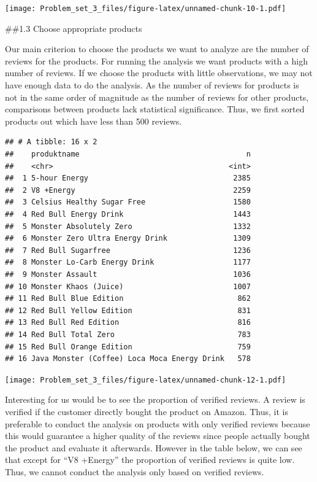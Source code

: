\documentclass[
]{article}
\begin{document}
\texttt{[image: Problem\_set\_3\_files/figure-latex/unnamed-chunk-10-1.pdf]}

\#\#1.3 Choose appropriate products

Our main criterion to choose the products we want to analyze are the
number of reviews for the products. For running the analysis we want
products with a high number of reviews. If we choose the products with
little observations, we may not have enough data to do the analysis. As
the number of reviews for products is not in the same order of magnitude
as the number of reviews for other products, comparisons between
products lack statistical significance. Thus, we first sorted products
out which have less than 500 reviews.

\begin{verbatim}
## # A tibble: 16 x 2
##    produktname                                      n
##    <chr>                                        <int>
##  1 5-hour Energy                                 2385
##  2 V8 +Energy                                    2259
##  3 Celsius Healthy Sugar Free                    1580
##  4 Red Bull Energy Drink                         1443
##  5 Monster Absolutely Zero                       1332
##  6 Monster Zero Ultra Energy Drink               1309
##  7 Red Bull Sugarfree                            1236
##  8 Monster Lo-Carb Energy Drink                  1177
##  9 Monster Assault                               1036
## 10 Monster Khaos (Juice)                         1007
## 11 Red Bull Blue Edition                          862
## 12 Red Bull Yellow Edition                        831
## 13 Red Bull Red Edition                           816
## 14 Red Bull Total Zero                            783
## 15 Red Bull Orange Edition                        759
## 16 Java Monster (Coffee) Loca Moca Energy Drink   578
\end{verbatim}

\texttt{[image: Problem\_set\_3\_files/figure-latex/unnamed-chunk-12-1.pdf]}

Interesting for us would be to see the proportion of verified reviews. A
review is verified if the customer directly bought the product on
Amazon. Thus, it is preferable to conduct the analysis on products with
only verified reviews because this would guarantee a higher quality of
the reviews since people actually bought the product and evaluate it
afterwards. However in the table below, we can see that except for ``V8
+Energy'' the proportion of verified reviews is quite low. Thus, we
cannot conduct the analysis only based on verified reviews.
\end{document}
